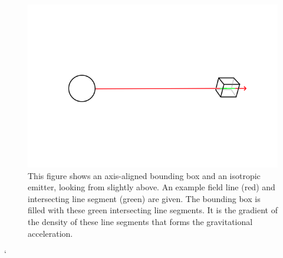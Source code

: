 \documentclass[12pt]{article}
\begin{document}
\pagebreak





\begin{figure} 
\centering
\label{fig1}
  \includegraphics[width =5 in]{AABB.png}
  \caption{
This figure shows an axis-aligned bounding box and an isotropic emitter, looking from slightly above.
An example field line (red) and intersecting line segment (green) are given.
The bounding box is filled with these green intersecting line segments.
It is the gradient of the density of these line segments that forms the gravitational acceleration.
}
\end{figure}`
\end{document}
